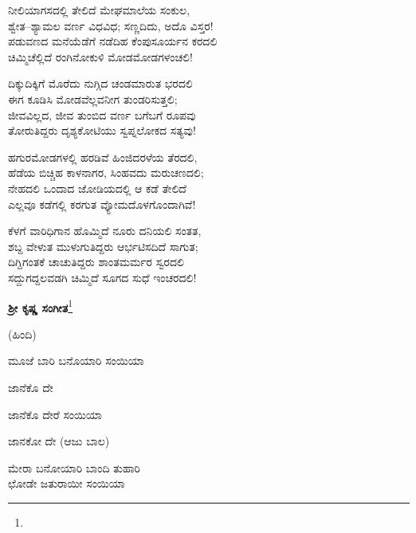 ನೀಲಿಯಾಗಸದಲ್ಲಿ ತೇಲಿದೆ ಮೇಘಮಾಲೆಯ ಸಂಕುಲ,\\ಶ್ವೇತ–ಶ್ಯಾಮಲ ವರ್ಣ ವಿಧವಿಧ; ಸಣ್ಣದಿದು, ಅದೊ ವಿಸ್ತರ!\\ಪಡುವಣದ ಮನೆಯೆಡೆಗೆ ನಡೆದಿಹ ಕೆಂಪುಸೂರ್ಯನ ಕರದಲಿ\\ಚಿಮ್ಮಿಚೆಲ್ಲಿದೆ ರಂಗಿನೋಕುಳಿ ಮೋಡಮೋಡಗಳಂಚಲಿ!

ದಿಕ್ಕುದಿಕ್ಕಿಗೆ ಮೊರೆದು ನುಗ್ಗಿದ ಚಂಡಮಾರುತ ಭರದಲಿ\\ಈಗ ಕೂಡಿಸಿ ಮೋಡವೆಲ್ಲವನೀಗ ತುಂಡರಿಸುತ್ತಲಿ;\\ಜೀವವಿಲ್ಲದ, ಜೀವ ತುಂಬಿದ ವರ್ಣ ಬಗೆಬಗೆ ರೂಪವು\\ತೋರುತಿದ್ದರು ದೃಶ್ಯಕೋಟಿಯು ಸ್ವಪ್ನಲೋಕದ ಸತ್ಯವು!

ಹಗುರಮೋಡಗಳಲ್ಲಿ ಹರಡಿವೆ ಹಿಂಜಿದರಳೆಯ ತೆರದಲಿ,\\ಹೆಡೆಯ ಬಿಚ್ಚಿಹ ಕಾಳನಾಗರ, ಸಿಂಹವದು ಮರುಚಣದಲಿ;\\ನೇಹದಲಿ ಒಂದಾದ ಜೋಡಿಯದಲ್ಲಿ ಆ ಕಡೆ ತೇಲಿದೆ\\ಎಲ್ಲವೂ ಕಡೆಗಲ್ಲಿ ಕರಗುತ ವ್ಯೋಮದೊಳಗೊಂದಾಗಿವೆ!

ಕೆಳಗೆ ವಾರಿಧಿಗಾನ ಹೊಮ್ಮಿದೆ ನೂರು ದನಿಯಲಿ ಸಂತತ,\\ಶಬ್ದ ವೇಳುತ ಮುಳುಗುತಿದ್ದರು ಆರ್ಭಟಿಸದಿದೆ ಸಾಗುತ;\\ದಿಗ್ದಿಗಂತಕೆ ಚಾಚುತಿದ್ದರು ಶಾಂತಮರ್ಮರ ಸ್ವರದಲಿ\\ಸದ್ದುಗದ್ದಲವಡಗಿ ಚಿಮ್ಮಿದೆ ಸೂಗದ ಸುಧೆ ಇಂಚರದಲಿ!

\begin{center}
\textbf{ಶ‍್ರೀ ಕೃಷ್ಣ ಸಂಗೀತ}\footnote{}
\end{center}

\begin{center}
(ಹಿಂದಿ)
\end{center}

\begin{myquote}
ಮೂಜೆ ಬಾರಿ ಬನೊಯಾರಿ ಸಂಯಿಯಾ
\end{myquote}

\begin{flushright}
ಜಾನೆಕೊ ದೇ
\end{flushright}

\begin{myquote}
ಜಾನೆಕೊ ದೇರೆ ಸಂಯಿಯಾ
\end{myquote}

\begin{flushright}
ಜಾನಕೋ ದೇ (ಆಜು ಬಾಲ)
\end{flushright}

\begin{myquote}
ಮೇರಾ ಬನೋಯಾರಿ ಬಾಂದಿ ತುಹಾರಿ\\ಛೋಡೇ ಜತುರಾಯೀ ಸಂಯಿಯಾ
\end{myquote}

